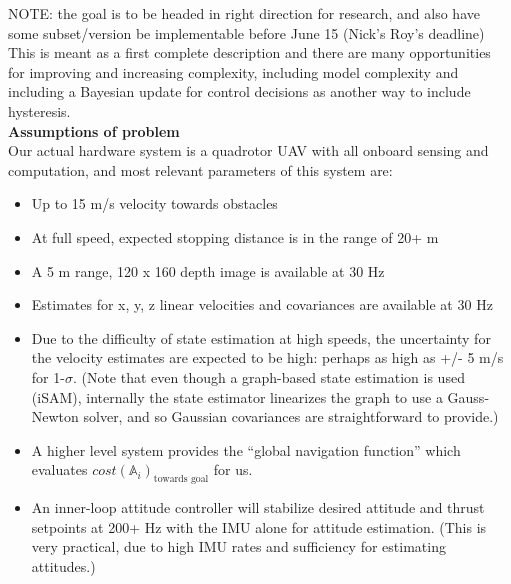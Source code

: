 \documentclass[paper=a4, fontsize=11pt]{scrartcl} %
\numberwithin{equation}{section} %
\numberwithin{figure}{section} %
\numberwithin{table}{section} %
\newcommand{\horrule}[1]{\rule{\linewidth}{#1}} %
\begin{document}
\newpage

NOTE: the goal is to be headed in right direction for research, and also have some subset/version be implementable before June 15 (Nick's Roy's deadline) \\

This is meant as a first complete description and there are many opportunities for improving and increasing complexity, including model complexity and including a Bayesian update for control decisions as another way to include hysteresis.\\  



\textbf{Assumptions of problem}
\\

Our actual hardware system is a quadrotor UAV with all onboard sensing and computation, and most relevant parameters of this system are: 
\begin{itemize}
\item Up to 15 m/s velocity towards obstacles
\item At full speed, expected stopping distance is in the range of 20+ m
\item A 5 m range, 120 x 160 depth image is available at 30 Hz
\item Estimates for x, y, z linear velocities and covariances are available at 30 Hz
\item Due to the difficulty of state estimation at high speeds, the uncertainty for the velocity estimates are expected to be high: perhaps as high as +/- 5 m/s for 1-$\sigma$.  (Note that even though a graph-based state estimation is used (iSAM), internally the state estimator linearizes the graph to use a Gauss-Newton solver, and so Gaussian covariances are straightforward to provide.)
\item A higher level system provides the ``global navigation function'' which evaluates $cost(\mathbb{A}_i)_{\text{towards goal}} $ for us.
\item An inner-loop attitude controller will stabilize desired attitude and thrust setpoints at 200+ Hz with the IMU alone for attitude estimation. (This is very practical, due to high IMU rates and sufficiency for estimating attitudes.)
\end{itemize}
\end{document}
